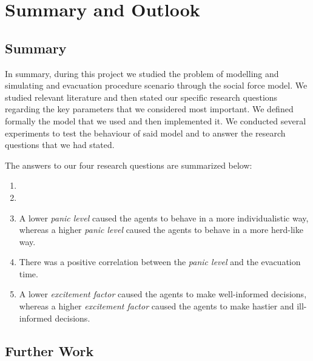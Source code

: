 \section{Summary and Outlook} \label{sec:7-summary}
\subsection{Summary}
In summary, during this project we studied the problem of modelling and simulating and evacuation procedure scenario through the social force model. We studied relevant literature and then stated our specific research questions regarding the key parameters that we considered most important. We defined formally the model that we used and then implemented it. We conducted several experiments to test the behaviour of said model and to answer the research questions that we had stated.

The answers to our four research questions are summarized below:
\begin{enumerate}
	\item 
	
	\item 
	
	\item A lower \emph{panic level} caused the agents to behave in a more individualistic way, whereas a higher \emph{panic level} caused the agents to behave in a more herd-like way.
	
	\item There was a positive correlation between the \emph{panic level} and the evacuation time.
	
	\item A lower \emph{excitement factor} caused the agents to make well-informed decisions, whereas a higher \emph{excitement factor} caused the agents to make hastier and ill-informed decisions.
\end{enumerate}

\subsection{Further Work}